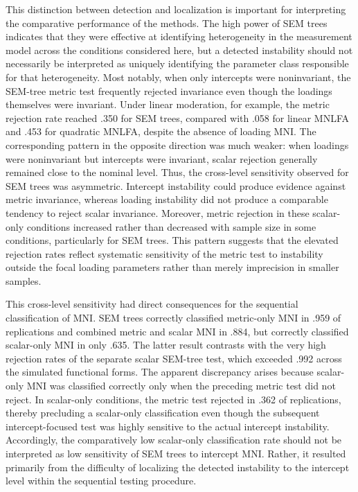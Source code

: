 \documentclass[
  man,
  floatsintext]{apa7}
\begin{document}
This distinction between detection and localization is important for
interpreting the comparative performance of the methods. The high power
of SEM trees indicates that they were effective at identifying
heterogeneity in the measurement model across the conditions considered
here, but a detected instability should not necessarily be interpreted
as uniquely identifying the parameter class responsible for that
heterogeneity. Most notably, when only intercepts were noninvariant, the
SEM-tree metric test frequently rejected invariance even though the
loadings themselves were invariant. Under linear moderation, for
example, the metric rejection rate reached .350 for SEM trees, compared
with .058 for linear MNLFA and .453 for quadratic MNLFA, despite the
absence of loading MNI. The corresponding pattern in the opposite
direction was much weaker: when loadings were noninvariant but
intercepts were invariant, scalar rejection generally remained close to
the nominal level. Thus, the cross-level sensitivity observed for SEM
trees was asymmetric. Intercept instability could produce evidence
against metric invariance, whereas loading instability did not produce a
comparable tendency to reject scalar invariance. Moreover, metric
rejection in these scalar-only conditions increased rather than
decreased with sample size in some conditions, particularly for SEM
trees. This pattern suggests that the elevated rejection rates reflect
systematic sensitivity of the metric test to instability outside the
focal loading parameters rather than merely imprecision in smaller
samples.

This cross-level sensitivity had direct consequences for the sequential
classification of MNI. SEM trees correctly classified metric-only MNI in
.959 of replications and combined metric and scalar MNI in .884, but
correctly classified scalar-only MNI in only .635. The latter result
contrasts with the very high rejection rates of the separate scalar
SEM-tree test, which exceeded .992 across the simulated functional
forms. The apparent discrepancy arises because scalar-only MNI was
classified correctly only when the preceding metric test did not reject.
In scalar-only conditions, the metric test rejected in .362 of
replications, thereby precluding a scalar-only classification even
though the subsequent intercept-focused test was highly sensitive to the
actual intercept instability. Accordingly, the comparatively low
scalar-only classification rate should not be interpreted as low
sensitivity of SEM trees to intercept MNI. Rather, it resulted primarily
from the difficulty of localizing the detected instability to the
intercept level within the sequential testing procedure.
\end{document}
